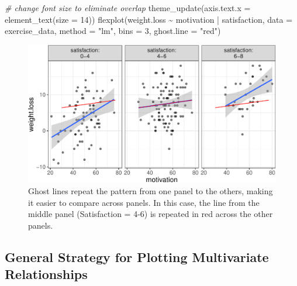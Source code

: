 \documentclass[
  english,
  man]{apa6}
\newenvironment{Shaded}{\begin{snugshade}}{\end{snugshade}}
\newcommand{\AttributeTok}[1]{\textcolor[rgb]{0.77,0.63,0.00}{#1}}
\newcommand{\CommentTok}[1]{\textcolor[rgb]{0.56,0.35,0.01}{\textit{#1}}}
\newcommand{\DecValTok}[1]{\textcolor[rgb]{0.00,0.00,0.81}{#1}}
\newcommand{\FunctionTok}[1]{\textcolor[rgb]{0.00,0.00,0.00}{#1}}
\newcommand{\NormalTok}[1]{#1}
\newcommand{\SpecialCharTok}[1]{\textcolor[rgb]{0.00,0.00,0.00}{#1}}
\newcommand{\StringTok}[1]{\textcolor[rgb]{0.31,0.60,0.02}{#1}}
\begin{document}
\small

\begin{Shaded}
\begin{Highlighting}[]
\CommentTok{\# change font size to eliminate overlap}
\FunctionTok{theme\_update}\NormalTok{(}\AttributeTok{axis.text.x =} 
            \FunctionTok{element\_text}\NormalTok{(}\AttributeTok{size =} \DecValTok{14}\NormalTok{))}
\FunctionTok{flexplot}\NormalTok{(weight.loss }\SpecialCharTok{\textasciitilde{}}\NormalTok{ motivation }\SpecialCharTok{|}\NormalTok{ satisfaction, }
             \AttributeTok{data =}\NormalTok{ exercise\_data, }\AttributeTok{method =} \StringTok{"lm"}\NormalTok{, }
             \AttributeTok{bins =} \DecValTok{3}\NormalTok{, }\AttributeTok{ghost.line =} \StringTok{"red"}\NormalTok{)}
\end{Highlighting}
\end{Shaded}

\begin{figure}

{\centering \includegraphics[width=0.8\linewidth]{flexplot_psychmeth_files/figure-latex/ghost-1} 

}

\caption{Ghost lines repeat the pattern from one panel to the others, making it easier to compare across panels. In this case, the line from the middle panel (Satisfaction = 4-6) is repeated in red across the other panels. \label{fig:ghost}}\label{fig:ghost}
\end{figure}

\normalsize

\hypertarget{general-strategy-for-plotting-multivariate-relationships}{%
\subsection{General Strategy for Plotting Multivariate Relationships}\label{general-strategy-for-plotting-multivariate-relationships}}
\end{document}
